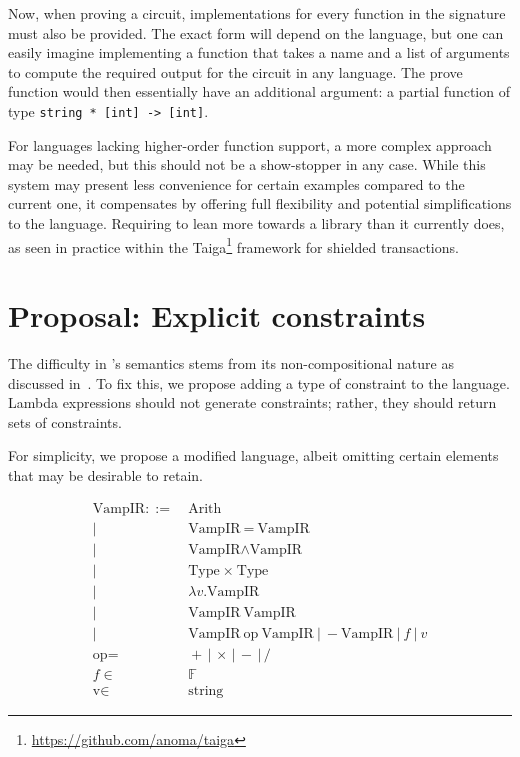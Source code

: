 \documentclass[
    9pt,            
    techreport,       
    affiltop,       
]{art}
\begin{document}
Now, when proving a circuit, implementations for every function in the signature must also be provided. The exact form will depend on the language, but one can easily imagine implementing a function that takes a name and a list of arguments to compute the required output for the circuit in any language. The prove function would then essentially have an additional argument: a partial function of type \texttt{string * [int] -> [int]}.

For languages lacking higher-order function support, a more complex approach may be needed, but this should not be a show-stopper in any case. While this system may present less convenience for certain examples compared to the current one, it compensates by offering full flexibility and potential simplifications to the language. Requiring \VampIR{} to lean more towards a library than it currently does, as seen in practice within the Taiga\footnote{\url{https://github.com/anoma/taiga}} framework for shielded transactions.

\section{Proposal: Explicit constraints}
\label{sec:explicit-constraints}

The difficulty in \VampIR{}'s semantics stems from its non-compositional nature as discussed in~. To fix this, we propose adding a type of constraint to the language. Lambda expressions should not generate constraints; rather, they should return sets of constraints.

For simplicity, we propose a modified language, albeit omitting certain elements that may be desirable to retain.

\begin{align*}
    \text{VampIR} ::=&\ \text{Arith} \\
    |\ &\ \text{VampIR} \ = \ \text{VampIR} \\
    |\ &\ \text{VampIR} \wedge \text{VampIR} \\
    |\ &\ \text{Type} \ \times \ \text{Type} \\
    |\ &\ \lambda v . \text{VampIR} \\
    |\ &\ \text{VampIR}\ \text{VampIR} \\
    |\ &\ \text{VampIR} \ \text{op} \ \text{VampIR} \
    |\ - \text{VampIR}\ |\ f\ |\ v \\
    \text{op} =&\ + \,|\, \times \,|\, - \,|\, / \\
    f \in&\ \mathbb{F} \\
    \text{v} \in&\ \text{string}
\end{align*}
\end{document}
